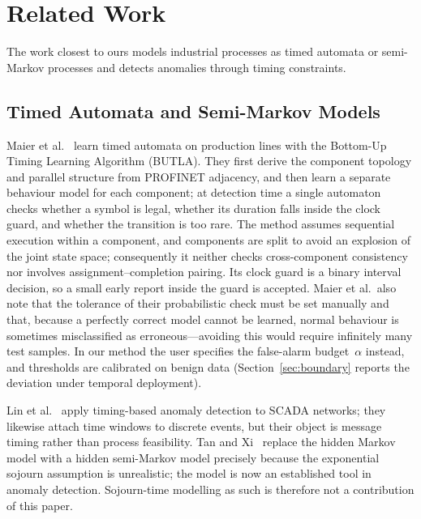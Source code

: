 \documentclass[manuscript,screen,review]{acmart}
\begin{document}
\section{Related Work}
\label{sec:related}

The work closest to ours models industrial processes as timed automata or semi-Markov processes and detects anomalies through timing constraints.

\subsection{Timed Automata and Semi-Markov Models}
\label{sec:rw_timed}

Maier et al.~\cite{maier2011timed} learn timed automata on production lines with the Bottom-Up Timing Learning Algorithm ({BUTLA}). They first derive the component topology and parallel structure from {PROFINET} adjacency, and then learn a separate behaviour model for each component; at detection time a single automaton checks whether a symbol is legal, whether its duration falls inside the clock guard, and whether the transition is too rare. The method assumes sequential execution within a component, and components are split to avoid an explosion of the joint state space; consequently it neither checks cross-component consistency nor involves assignment--completion pairing. Its clock guard is a binary interval decision, so a small early report inside the guard is accepted. Maier et al.\ also note that the tolerance of their probabilistic check must be set manually and that, because a perfectly correct model cannot be learned, normal behaviour is sometimes misclassified as erroneous---avoiding this would require infinitely many test samples. In our method the user specifies the false-alarm budget~$\alpha$ instead, and thresholds are calibrated on benign data (Section~\ref{sec:boundary} reports the deviation under temporal deployment).

Lin et al.~\cite{lin2018timing} apply timing-based anomaly detection to {SCADA} networks; they likewise attach time windows to discrete events, but their object is message timing rather than process feasibility. Tan and Xi~\cite{tan2008hsmm} replace the hidden Markov model with a hidden semi-Markov model precisely because the exponential sojourn assumption is unrealistic; the model is now an established tool in anomaly detection. Sojourn-time modelling as such is therefore not a contribution of this paper.
\end{document}
